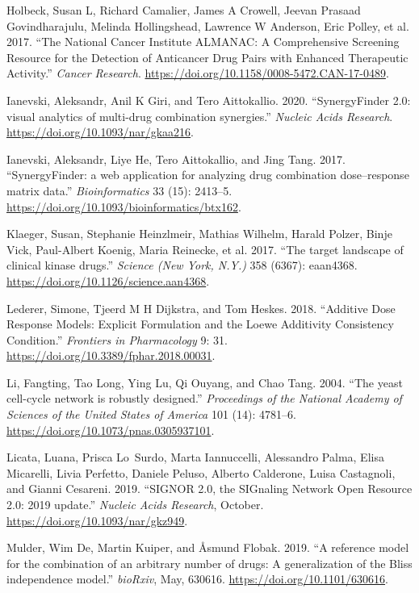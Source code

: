 \documentclass[
  12pt,
]{book}
\newlength{\cslhangindent}
\newenvironment{cslreferences}%
  {\setlength{\parindent}{0pt}%
  \everypar{\setlength{\hangindent}{\cslhangindent}}\ignorespaces}%
  {\par}
\begin{document}
\begin{cslreferences}
\leavevmode\hypertarget{ref-Holbeck2017}{}%
Holbeck, Susan L, Richard Camalier, James A Crowell, Jeevan Prasaad Govindharajulu, Melinda Hollingshead, Lawrence W Anderson, Eric Polley, et al. 2017. ``The National Cancer Institute ALMANAC: A Comprehensive Screening Resource for the Detection of Anticancer Drug Pairs with Enhanced Therapeutic Activity.'' \emph{Cancer Research}. \url{https://doi.org/10.1158/0008-5472.CAN-17-0489}.

\leavevmode\hypertarget{ref-Ianevski2020}{}%
Ianevski, Aleksandr, Anil K Giri, and Tero Aittokallio. 2020. ``SynergyFinder 2.0: visual analytics of multi-drug combination synergies.'' \emph{Nucleic Acids Research}. \url{https://doi.org/10.1093/nar/gkaa216}.

\leavevmode\hypertarget{ref-Ianevski2017}{}%
Ianevski, Aleksandr, Liye He, Tero Aittokallio, and Jing Tang. 2017. ``SynergyFinder: a web application for analyzing drug combination dose--response matrix data.'' \emph{Bioinformatics} 33 (15): 2413--5. \url{https://doi.org/10.1093/bioinformatics/btx162}.

\leavevmode\hypertarget{ref-Klaeger2017}{}%
Klaeger, Susan, Stephanie Heinzlmeir, Mathias Wilhelm, Harald Polzer, Binje Vick, Paul-Albert Koenig, Maria Reinecke, et al. 2017. ``The target landscape of clinical kinase drugs.'' \emph{Science (New York, N.Y.)} 358 (6367): eaan4368. \url{https://doi.org/10.1126/science.aan4368}.

\leavevmode\hypertarget{ref-Lederer2018}{}%
Lederer, Simone, Tjeerd M H Dijkstra, and Tom Heskes. 2018. ``Additive Dose Response Models: Explicit Formulation and the Loewe Additivity Consistency Condition.'' \emph{Frontiers in Pharmacology} 9: 31. \url{https://doi.org/10.3389/fphar.2018.00031}.

\leavevmode\hypertarget{ref-Li2004}{}%
Li, Fangting, Tao Long, Ying Lu, Qi Ouyang, and Chao Tang. 2004. ``The yeast cell-cycle network is robustly designed.'' \emph{Proceedings of the National Academy of Sciences of the United States of America} 101 (14): 4781--6. \url{https://doi.org/10.1073/pnas.0305937101}.

\leavevmode\hypertarget{ref-Licata2019}{}%
Licata, Luana, Prisca Lo~Surdo, Marta Iannuccelli, Alessandro Palma, Elisa Micarelli, Livia Perfetto, Daniele Peluso, Alberto Calderone, Luisa Castagnoli, and Gianni Cesareni. 2019. ``SIGNOR 2.0, the SIGnaling Network Open Resource 2.0: 2019 update.'' \emph{Nucleic Acids Research}, October. \url{https://doi.org/10.1093/nar/gkz949}.

\leavevmode\hypertarget{ref-Mulder2019}{}%
Mulder, Wim De, Martin Kuiper, and Åsmund Flobak. 2019. ``A reference model for the combination of an arbitrary number of drugs: A generalization of the Bliss independence model.'' \emph{bioRxiv}, May, 630616. \url{https://doi.org/10.1101/630616}.


\end{cslreferences}
\end{document}
